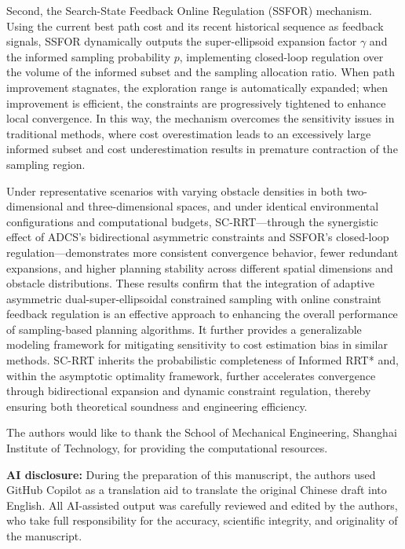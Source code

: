\documentclass[sn-mathphys-num]{sn-jnl}%
\begin{document}
Second, the Search-State Feedback Online Regulation (SSFOR) mechanism. Using the current best path cost and its recent historical sequence as feedback signals, SSFOR dynamically outputs the super-ellipsoid expansion factor $\gamma$ and the informed sampling probability $p$, implementing closed-loop regulation over the volume of the informed subset and the sampling allocation ratio. When path improvement stagnates, the exploration range is automatically expanded; when improvement is efficient, the constraints are progressively tightened to enhance local convergence. In this way, the mechanism overcomes the sensitivity issues in traditional methods, where cost overestimation leads to an excessively large informed subset and cost underestimation results in premature contraction of the sampling region.

Under representative scenarios with varying obstacle densities in both two-dimensional and three-dimensional spaces, and under identical environmental configurations and computational budgets, SC-RRT---through the synergistic effect of ADCS's bidirectional asymmetric constraints and SSFOR's closed-loop regulation---demonstrates more consistent convergence behavior, fewer redundant expansions, and higher planning stability across different spatial dimensions and obstacle distributions. These results confirm that the integration of adaptive asymmetric dual-super-ellipsoidal constrained sampling with online constraint feedback regulation is an effective approach to enhancing the overall performance of sampling-based planning algorithms. It further provides a generalizable modeling framework for mitigating sensitivity to cost estimation bias in similar methods. SC-RRT inherits the probabilistic completeness of Informed RRT* and, within the asymptotic optimality framework, further accelerates convergence through bidirectional expansion and dynamic constraint regulation, thereby ensuring both theoretical soundness and engineering efficiency.

\backmatter
{}

The authors would like to thank the School of Mechanical Engineering, Shanghai Institute of Technology, for providing the computational resources.

\textbf{AI disclosure:} During the preparation of this manuscript, the authors used GitHub Copilot as a translation aid to translate the original Chinese draft into English. All AI-assisted output was carefully reviewed and edited by the authors, who take full responsibility for the accuracy, scientific integrity, and originality of the manuscript.
\end{document}
